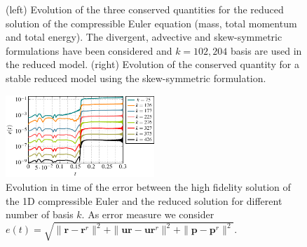 \begin{figure} [h!]
\begin{centering}
{	}
	\caption{ (left)  Evolution of the three conserved quantities for the reduced solution of the compressible Euler equation (mass, total momentum and total energy).  The divergent, advective and skew-symmetric formulations have been considered and $k=102,204$ basis are used in the reduced model. (right) Evolution of the conserved quantity for a stable reduced model using the skew-symmetric formulation.}
	\label{p4.fig:energy_pres_1D}
	\end{centering}
\end{figure}

\begin{figure}[h!]
\centering
	\includegraphics[width=0.5\textwidth]{./TikzFigures/thesis-figure14}
\caption{Evolution in time of the error  between the high fidelity solution of the 1D compressible Euler and the reduced solution for different number of basis $k$. As error measure we consider $e(t)=\sqrt{\|\mathbf{r}-\mathbf{r}^r\|^2+\|\mathbf{ur}-\mathbf{ur}^r\|^2+\|\mathbf{p}-\mathbf{p}^r\|^2}$.}
\label{p4.error_behaviour_1D}
\end{figure}

